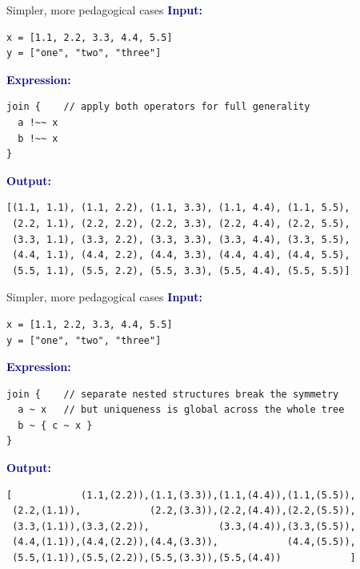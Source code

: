 \documentclass[aspectratio=169]{beamer}
\begin{document}
\begin{frame}[fragile]{Simpler, more pedagogical cases}
\vspace{0.25 cm}
\textcolor{darkblue}{\large\bf Input:}

\begin{verbatim}
x = [1.1, 2.2, 3.3, 4.4, 5.5]
y = ["one", "two", "three"]
\end{verbatim}

\vspace{0.25 cm}
\textcolor{darkblue}{\large\bf Expression:}

\begin{verbatim}
join {    // apply both operators for full generality
  a !~~ x
  b !~~ x
}
\end{verbatim}

\vspace{0.25 cm}
\textcolor{darkblue}{\large\bf Output:}
\begin{verbatim}
[(1.1, 1.1), (1.1, 2.2), (1.1, 3.3), (1.1, 4.4), (1.1, 5.5),
 (2.2, 1.1), (2.2, 2.2), (2.2, 3.3), (2.2, 4.4), (2.2, 5.5),
 (3.3, 1.1), (3.3, 2.2), (3.3, 3.3), (3.3, 4.4), (3.3, 5.5),
 (4.4, 1.1), (4.4, 2.2), (4.4, 3.3), (4.4, 4.4), (4.4, 5.5),
 (5.5, 1.1), (5.5, 2.2), (5.5, 3.3), (5.5, 4.4), (5.5, 5.5)]
\end{verbatim}
\end{frame}

\begin{frame}[fragile]{Simpler, more pedagogical cases}
\vspace{0.25 cm}
\textcolor{darkblue}{\large\bf Input:}

\begin{verbatim}
x = [1.1, 2.2, 3.3, 4.4, 5.5]
y = ["one", "two", "three"]
\end{verbatim}

\vspace{0.25 cm}
\textcolor{darkblue}{\large\bf Expression:}

\begin{verbatim}
join {    // separate nested structures break the symmetry
  a ~ x   // but uniqueness is global across the whole tree
  b ~ { c ~ x }
}
\end{verbatim}

\vspace{0.25 cm}
\textcolor{darkblue}{\large\bf Output:}

\begin{verbatim}
[            (1.1,(2.2)),(1.1,(3.3)),(1.1,(4.4)),(1.1,(5.5)),
 (2.2,(1.1)),            (2.2,(3.3)),(2.2,(4.4)),(2.2,(5.5)),
 (3.3,(1.1)),(3.3,(2.2)),            (3.3,(4.4)),(3.3,(5.5)),
 (4.4,(1.1)),(4.4,(2.2)),(4.4,(3.3)),            (4.4,(5.5)),
 (5.5,(1.1)),(5.5,(2.2)),(5.5,(3.3)),(5.5,(4.4))            ]
\end{verbatim}
\end{frame}
\end{document}

